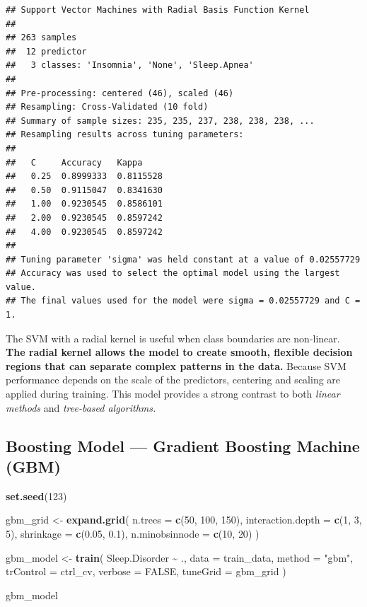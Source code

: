 \documentclass[
]{article}
\newenvironment{Shaded}{\begin{snugshade}}{\end{snugshade}}
\newcommand{\AttributeTok}[1]{\textcolor[rgb]{0.13,0.29,0.53}{#1}}
\newcommand{\ConstantTok}[1]{\textcolor[rgb]{0.56,0.35,0.01}{#1}}
\newcommand{\DecValTok}[1]{\textcolor[rgb]{0.00,0.00,0.81}{#1}}
\newcommand{\FloatTok}[1]{\textcolor[rgb]{0.00,0.00,0.81}{#1}}
\newcommand{\FunctionTok}[1]{\textcolor[rgb]{0.13,0.29,0.53}{\textbf{#1}}}
\newcommand{\NormalTok}[1]{#1}
\newcommand{\OtherTok}[1]{\textcolor[rgb]{0.56,0.35,0.01}{#1}}
\newcommand{\SpecialCharTok}[1]{\textcolor[rgb]{0.81,0.36,0.00}{\textbf{#1}}}
\newcommand{\StringTok}[1]{\textcolor[rgb]{0.31,0.60,0.02}{#1}}
\begin{document}
\begin{verbatim}
## Support Vector Machines with Radial Basis Function Kernel 
## 
## 263 samples
##  12 predictor
##   3 classes: 'Insomnia', 'None', 'Sleep.Apnea' 
## 
## Pre-processing: centered (46), scaled (46) 
## Resampling: Cross-Validated (10 fold) 
## Summary of sample sizes: 235, 235, 237, 238, 238, 238, ... 
## Resampling results across tuning parameters:
## 
##   C     Accuracy   Kappa    
##   0.25  0.8999333  0.8115528
##   0.50  0.9115047  0.8341630
##   1.00  0.9230545  0.8586101
##   2.00  0.9230545  0.8597242
##   4.00  0.9230545  0.8597242
## 
## Tuning parameter 'sigma' was held constant at a value of 0.02557729
## Accuracy was used to select the optimal model using the largest value.
## The final values used for the model were sigma = 0.02557729 and C = 1.
\end{verbatim}

The SVM with a radial kernel is useful when class boundaries are
non-linear. \textbf{The radial kernel allows the model to create smooth,
flexible decision regions that can separate complex patterns in the
data.} Because SVM performance depends on the scale of the predictors,
centering and scaling are applied during training. This model provides a
strong contrast to both \emph{linear methods} and \emph{tree-based
algorithms.}

\subsection{Boosting Model --- Gradient Boosting Machine
(GBM)}\label{boosting-model-gradient-boosting-machine-gbm}

\begin{Shaded}
\begin{Highlighting}[]
\FunctionTok{set.seed}\NormalTok{(}\DecValTok{123}\NormalTok{)}

\NormalTok{gbm\_grid }\OtherTok{\textless{}{-}} \FunctionTok{expand.grid}\NormalTok{(}
  \AttributeTok{n.trees =} \FunctionTok{c}\NormalTok{(}\DecValTok{50}\NormalTok{, }\DecValTok{100}\NormalTok{, }\DecValTok{150}\NormalTok{),}
  \AttributeTok{interaction.depth =} \FunctionTok{c}\NormalTok{(}\DecValTok{1}\NormalTok{, }\DecValTok{3}\NormalTok{, }\DecValTok{5}\NormalTok{),}
  \AttributeTok{shrinkage =} \FunctionTok{c}\NormalTok{(}\FloatTok{0.05}\NormalTok{, }\FloatTok{0.1}\NormalTok{),}
  \AttributeTok{n.minobsinnode =} \FunctionTok{c}\NormalTok{(}\DecValTok{10}\NormalTok{, }\DecValTok{20}\NormalTok{)}
\NormalTok{)}

\NormalTok{gbm\_model }\OtherTok{\textless{}{-}} \FunctionTok{train}\NormalTok{(}
\NormalTok{  Sleep.Disorder }\SpecialCharTok{\textasciitilde{}}\NormalTok{ .,}
  \AttributeTok{data =}\NormalTok{ train\_data,}
  \AttributeTok{method =} \StringTok{"gbm"}\NormalTok{,}
  \AttributeTok{trControl =}\NormalTok{ ctrl\_cv,}
  \AttributeTok{verbose =} \ConstantTok{FALSE}\NormalTok{,}
  \AttributeTok{tuneGrid =}\NormalTok{ gbm\_grid}
\NormalTok{)}

\NormalTok{gbm\_model}
\end{Highlighting}
\end{Shaded}
\end{document}
